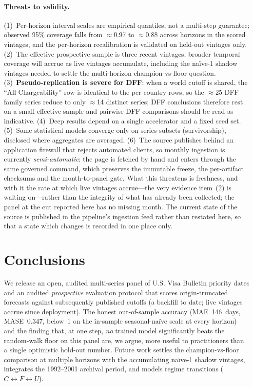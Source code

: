\documentclass[runningheads]{llncs}
\begin{document}
\paragraph{Threats to validity.} (1)~Per-horizon interval scales are empirical
quantiles, not a multi-step guarantee; observed 95\% coverage falls from
$\approx$0.97 to $\approx$0.88 across horizons in the scored vintages, and the
per-horizon recalibration is validated on held-out vintages only. (2)~The effective
prospective sample is three recent vintages; broader temporal coverage will accrue
as live vintages accumulate, including the naïve-1 shadow vintages needed to settle
the multi-horizon champion-vs-floor question. (3)~\textbf{Pseudo-replication is
severe for DFF}: when a world cutoff is shared, the ``All-Chargeability'' row is
identical to the per-country rows, so the $\approx$25 DFF family series reduce to
only $\approx$14 distinct series; DFF conclusions therefore rest on a small
effective sample and pairwise DFF comparisons should be read as indicative.
(4)~Deep results depend on a single accelerator and a fixed seed set. (5)~Some
statistical models converge only on series subsets (survivorship), disclosed where
aggregates are averaged. (6)~The source publishes behind an application
firewall that rejects automated clients, so monthly ingestion is currently
\emph{semi-automatic}: the page is fetched by hand and enters through the same
governed command, which preserves the immutable freeze, the per-artifact checksums and
the month-to-panel gate. What this threatens is freshness, and with it the rate at
which live vintages accrue---the very evidence item~(2) is waiting on---rather than the
integrity of what has already been collected; the panel at the cut reported here has no
missing month. The current state of the source is published in the pipeline's ingestion
feed rather than restated here, so that a state which changes is recorded in one place
only.

\section{Conclusions}
\label{sec:conclusions}

We release an open, audited multi-series panel of U.S. Visa Bulletin priority dates
and an audited \emph{prospective} evaluation protocol that scores
origin-truncated forecasts against subsequently published cutoffs (a backfill to
date; live vintages accrue since deployment). The honest out-of-sample accuracy
(MAE~146~days, MASE~0.347, below~1 on the in-sample seasonal-naïve scale at every
horizon) and the
finding that, at one step, \emph{no} trained model significantly beats the
random-walk floor on this panel are, we argue, more useful to practitioners than a
single optimistic hold-out number. Future work settles the champion-vs-floor
comparison at multiple horizons with the accumulating naïve-1 shadow vintages,
integrates the 1992--2001 archival period, and models regime transitions
($C\!\leftrightarrow\!F\!\leftrightarrow\!U$).
\end{document}

